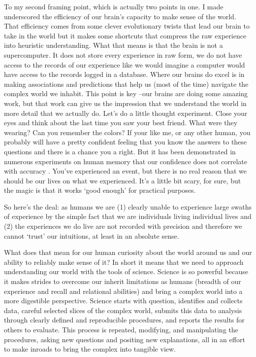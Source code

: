 \documentclass[
]{article}
\begin{document}
To my second framing point, which is actually two points in one. I made underscored the efficiency of our brain's capacity to make sense of the world. That efficiency comes from some clever evolutionary twists that lead our brain to take in the world but it makes some shortcuts that compress the raw experience into heuristic understanding. What that means is that the brain is not a supercomputer. It does not store every experience in raw form, we do not have access to the records of our experience like we would imagine a computer would have access to the records logged in a database. Where our brains do excel is in making associations and predictions that help us (most of the time) navigate the complex world we inhabit. This point is key --our brains are doing some amazing work, but that work can give us the impression that we understand the world in more detail that we actually do. Let's do a little thought experiment. Close your eyes and think about the last time you saw your best friend. What were they wearing? Can you remember the colors? If your like me, or any other human, you probably will have a pretty confident feeling that you know the answers to these questions and there is a chance you a right. But it has been demonstrated in numerous experiments on human memory that our confidence does not correlate with accuracy \citep{Talarico2003, roediger:2000}. You've experienced an event, but there is no real reason that we should be our lives on what we experienced. It's a little bit scary, for sure, but the magic is that it works `good enough' for practical purposes.

So here's the deal: as humans we are (1) clearly unable to experience large swaths of experience by the simple fact that we are individuals living individual lives and (2) the experiences we do live are not recorded with precision and therefore we cannot `trust' our intuitions, at least in an absolute sense.

What does that mean for our human curiosity about the world around us and our ability to reliably make sense of it? In short it means that we need to approach understanding our world with the tools of science. Science is so powerful because it makes strides to overcome our inherit limitations as humans (breadth of our experience and recall and relational abilities) and bring a complex world into a more digestible perspective. Science starts with question, identifies and collects data, careful selected slices of the complex world, submits this data to analysis through clearly defined and reproducible procedures, and reports the results for others to evaluate. This process is repeated, modifying, and manipulating the procedures, asking new questions and positing new explanations, all in an effort to make inroads to bring the complex into tangible view.
\end{document}
